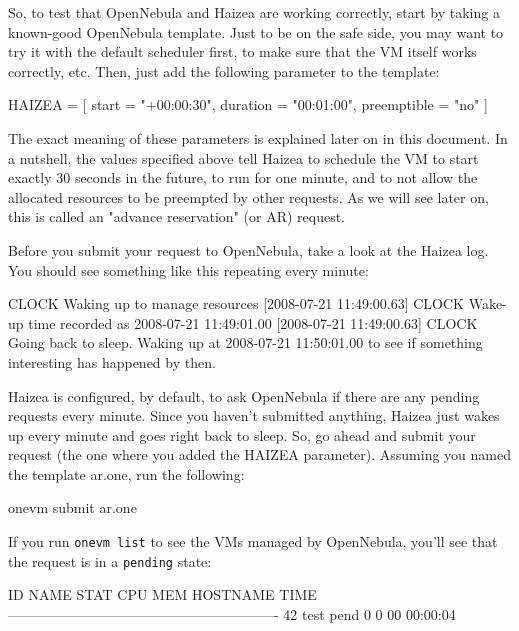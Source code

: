 So, to test that OpenNebula and Haizea are working correctly, start by taking a known-good OpenNebula template. Just to be on the safe side, you may want to try it with the default scheduler first, to make sure that the VM itself works correctly, etc. Then, just add the following parameter to the template:

\begin{wideshellverbatim}
HAIZEA = [
  start        = "+00:00:30",
  duration     = "00:01:00",
  preemptible  = "no"
]
\end{wideshellverbatim}

The exact meaning of these parameters is explained later on in this document. In a nutshell, the values specified above tell Haizea to schedule the VM to start exactly 30 seconds in the future, to run for one minute, and to not allow the allocated resources to be preempted by other requests. As we will see later on, this is called an "advance reservation" (or AR) request.

Before you submit your request to OpenNebula, take a look at the Haizea log. You should see something like this repeating every minute:

\begin{wideshellverbatim}
[2008-07-21 11:49:00.63] CLOCK   Waking up to manage resources
[2008-07-21 11:49:00.63] CLOCK   Wake-up time recorded as 2008-07-21 11:49:01.00
[2008-07-21 11:49:00.63] CLOCK   Going back to sleep. 
                                 Waking up at 2008-07-21 11:50:01.00 
                                 to see if something interesting has happened by then.
\end{wideshellverbatim}

Haizea is configured, by default, to ask OpenNebula if there are any pending requests every minute. Since you haven't submitted anything, Haizea just wakes up every minute and goes right back to sleep. So, go ahead and submit your request (the one where you added the HAIZEA parameter). Assuming you named the template ar.one, run the following:

\begin{wideshellverbatim}
onevm submit ar.one
\end{wideshellverbatim}

If you run \texttt{onevm list} to see the VMs managed by OpenNebula, you'll see that the request is in a \texttt{pending} state:

\begin{wideshellverbatim}
  ID     NAME STAT CPU     MEM        HOSTNAME        TIME
----------------------------------------------------------
  42     test pend   0       0                 00 00:00:04
\end{wideshellverbatim}

